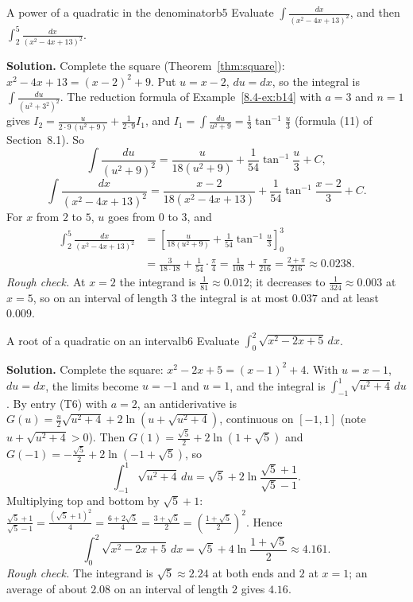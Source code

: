 \documentclass[11pt]{article}
\begin{document}
\begin{exmp}{A power of a quadratic in the denominator}{b5}
Evaluate $\displaystyle\int\frac{dx}{(x^2-4x+13)^2}$, and then $\displaystyle\int_2^5\frac{dx}{(x^2-4x+13)^2}$.

\textbf{Solution.} Complete the square (Theorem~\ref{thm:square}): $x^2-4x+13=(x-2)^2+9$. Put $u=x-2$, $du=dx$, so the integral is $\int\frac{du}{(u^2+3^2)^2}$. The reduction formula of Example~\ref{8.4-ex:b14} with $a=3$ and $n=1$ gives $I_2=\frac{u}{2\cdot9\,(u^2+9)}+\frac{1}{2\cdot9}I_1$, and $I_1=\int\frac{du}{u^2+9}=\frac13\tan^{-1}\frac u3$ (formula (11) of Section~8.1). So
\[\int\frac{du}{(u^2+9)^2}=\frac u{18(u^2+9)}+\frac1{54}\tan^{-1}\frac u3+C,\]
\[\int\frac{dx}{(x^2-4x+13)^2}=\frac{x-2}{18\left(x^2-4x+13\right)}+\frac1{54}\tan^{-1}\frac{x-2}3+C .\]
For $x$ from $2$ to $5$, $u$ goes from $0$ to $3$, and
\begin{align*}\int_2^5\frac{dx}{(x^2-4x+13)^2}&=\left[\frac u{18(u^2+9)}+\frac1{54}\tan^{-1}\frac u3\right]_0^3\\&=\frac3{18\cdot18}+\frac1{54}\cdot\frac\pi4=\frac1{108}+\frac\pi{216}=\frac{2+\pi}{216}\approx0.0238 .\end{align*}
\emph{Rough check.} At $x=2$ the integrand is $\frac1{81}\approx0.012$; it decreases to $\frac1{324}\approx0.003$ at $x=5$, so on an interval of length $3$ the integral is at most $0.037$ and at least $0.009$.
\end{exmp}

\begin{exmp}{A root of a quadratic on an interval}{b6}
Evaluate $\displaystyle\int_0^2\sqrt{x^2-2x+5}\,dx$.

\textbf{Solution.} Complete the square: $x^2-2x+5=(x-1)^2+4$. With $u=x-1$, $du=dx$, the limits become $u=-1$ and $u=1$, and the integral is $\int_{-1}^{1}\sqrt{u^2+4}\,du$. By entry (T6) with $a=2$, an antiderivative is $G(u)=\frac u2\sqrt{u^2+4}+2\ln\left(u+\sqrt{u^2+4}\right)$, continuous on $[-1,1]$ (note $u+\sqrt{u^2+4}>0$). Then $G(1)=\frac{\sqrt5}2+2\ln\left(1+\sqrt5\right)$ and $G(-1)=-\frac{\sqrt5}2+2\ln\left(-1+\sqrt5\right)$, so
\[\int_{-1}^1\sqrt{u^2+4}\,du=\sqrt5+2\ln\frac{\sqrt5+1}{\sqrt5-1}.\]
Multiplying top and bottom by $\sqrt5+1$: $\frac{\sqrt5+1}{\sqrt5-1}=\frac{(\sqrt5+1)^2}{4}=\frac{6+2\sqrt5}4=\frac{3+\sqrt5}2=\left(\frac{1+\sqrt5}2\right)^2$. Hence
\[\int_0^2\sqrt{x^2-2x+5}\,dx=\sqrt5+4\ln\frac{1+\sqrt5}2\approx4.161 .\]
\emph{Rough check.} The integrand is $\sqrt5\approx2.24$ at both ends and $2$ at $x=1$; an average of about $2.08$ on an interval of length $2$ gives $4.16$.
\end{exmp}
\end{document}
